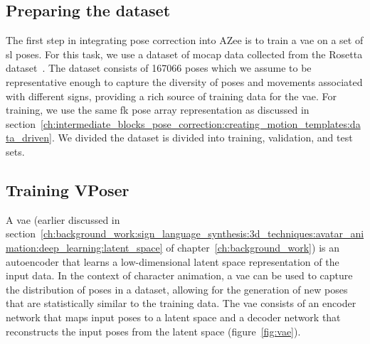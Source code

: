 \documentclass[../../main.tex]{subfiles}
\begin{document}
\subsection{Preparing the dataset}
\label{ch:intermediate_blocks_pose_correction:pose_correction_with_azee:dataset}

The first step in integrating pose correction into AZee is to train a \gls{vae} on a set of \gls{sl} poses. For this task, we use a dataset of \gls{mocap} data collected from the Rosetta dataset~\cite{bertin2022rosetta}. The dataset consists of 167066 poses which we assume to be representative enough to capture the diversity of poses and movements associated with different signs, providing a rich source of training data for the \gls{vae}. For training, we use the same \gls{fk} pose array representation as discussed in section~\ref{ch:intermediate_blocks_pose_correction:creating_motion_templates:data_driven}. We divided the dataset is divided into training, validation, and test sets.

\subsection{Training VPoser}
\label{ch:intermediate_blocks_pose_correction:pose_correction_with_azee:training}

A \gls{vae} (earlier discussed in section~\ref{ch:background_work:sign_language_synthesis:3d_techniques:avatar_animation:deep_learning:latent_space} of chapter~\ref{ch:background_work}) is an autoencoder that learns a low-dimensional latent space representation of the input data. In the context of character animation, a \gls{vae} can be used to capture the distribution of poses in a dataset, allowing for the generation of new poses that are statistically similar to the training data. The \gls{vae} consists of an encoder network that maps input poses to a latent space and a decoder network that reconstructs the input poses from the latent space (figure~\ref{fig:vae}).
\end{document}
